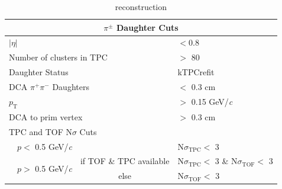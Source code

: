 \documentclass[/home/jesse/Analysis/FemtoAnalysis/AnalysisNotes/AnalysisNoteJBuxton.tex]{subfiles}
\begin{document}
\begin{table}[htbp]
\begin{tabular}{lc|c|l}
   
   \multicolumn{4}{c}{\textbf{$\pi^{\pm}$ Daughter Cuts}} \\
   \hline
   \multicolumn{3}{l|}{$|\eta|$} &  $< 0.8$ \\
   \hline
   \multicolumn{3}{l|}{Number of clusters in TPC} & $>$ 80 \\
   \hline
   \multicolumn{3}{l|}{Daughter Status} & kTPCrefit \\
   \hline
   \multicolumn{3}{l|}{DCA $\pi^{+}\pi^{-}$ Daughters} & $<$ 0.3 cm \\
   \hline
   \multicolumn{3}{l|}{$p_{\mathrm{T}}$} & $>$ 0.15 GeV/\textit{c} \\
   \hline
   \multicolumn{3}{l|}{DCA to prim vertex} & $>$ 0.3 cm \\
   \hline
   \multicolumn{4}{l}{TPC and TOF N$\sigma$ Cuts} \\
   \hline
    & \multicolumn{1}{c}{$p <$ 0.5 GeV/\textit{c}} &  & N$\sigma_{\mathrm{TPC}} <$ 3 \\
   \hline
    & \multirow{2}{*}{$p >$ 0.5 GeV/\textit{c}} &  if TOF \& TPC available & N$\sigma_{\mathrm{TPC}} <$ 3 \& N$\sigma_{\mathrm{TOF}} <$ 3 \\
   \cline{3-4}
    & & else & N$\sigma_{\mathrm{TOF}} <$ 3 \\
   \hline   
  \end{tabular}
 \caption[\Ks reconstruction]{\Ks reconstruction}
 \label{tab:K0sCuts} 
\end{table}
\end{document}
